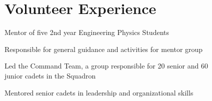 \documentclass[]{deedy-resume-openfont}
\begin{document}

\section{Volunteer Experience}
\begin{tightemize}
	\item Mentor of five 2nd year Engineering Physics Students
	\item Responsible for general guidance and activities for mentor group
\end{tightemize}
\sectionsep

\begin{tightemize}
	\item Led the Command Team, a group responsible for 20 senior and 60 \\  junior cadets in the Squadron
	\item Mentored senior cadets in leadership and organizational skills
\end{tightemize}
\sectionsep
\end{document}
